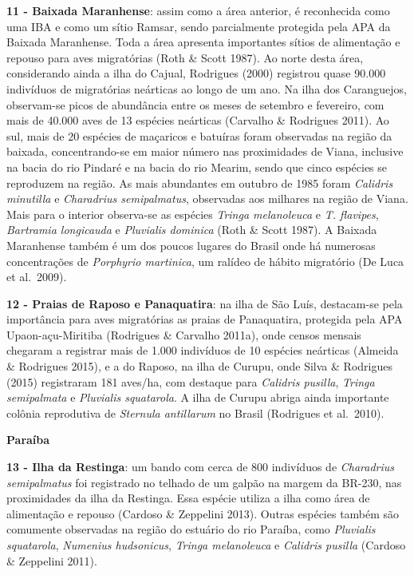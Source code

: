 \documentclass[
  oneside]{scrbook}
\begin{document}
\textbf{11 - Baixada Maranhense}: assim como a área anterior, é reconhecida como uma IBA e como um sítio Ramsar, sendo parcialmente protegida pela APA da Baixada Maranhense. Toda a área apresenta importantes sítios de alimentação e repouso para aves migratórias (Roth \& Scott 1987). Ao norte desta área, considerando ainda a ilha do Cajual, Rodrigues (2000) registrou quase 90.000 indivíduos de migratórias neárticas ao longo de um ano. Na ilha dos Caranguejos, observam-se picos de abundância entre os meses de setembro e fevereiro, com mais de 40.000 aves de 13 espécies neárticas (Carvalho \& Rodrigues 2011). Ao sul, mais de 20 espécies de maçaricos e batuíras foram observadas na região da baixada, concentrando-se em maior número nas proximidades de Viana, inclusive na bacia do rio Pindaré e na bacia do rio Mearim, sendo que cinco espécies se reproduzem na região. As mais abundantes em outubro de 1985 foram \emph{Calidris minutilla} e \emph{Charadrius semipalmatus}, observadas aos milhares na região de Viana. Mais para o interior observa-se as espécies \emph{Tringa melanoleuca} e \emph{T. flavipes}, \emph{Bartramia longicauda} e \emph{Pluvialis dominica} (Roth \& Scott 1987). A Baixada Maranhense também é um dos poucos lugares do Brasil onde há numerosas concentrações de \emph{Porphyrio martinica}, um ralídeo de hábito migratório (De Luca et al.~2009).

\textbf{12 - Praias de Raposo e Panaquatira}: na ilha de São Luís, destacam-se pela importância para aves migratórias as praias de Panaquatira, protegida pela APA Upaon-açu-Miritiba (Rodrigues \& Carvalho 2011a), onde censos mensais chegaram a registrar mais de 1.000 indivíduos de 10 espécies neárticas (Almeida \& Rodrigues 2015), e a do Raposo, na ilha de Curupu, onde Silva \& Rodrigues (2015) registraram 181 aves/ha, com destaque para \emph{Calidris pusilla}, \emph{Tringa semipalmata} e \emph{Pluvialis squatarola}. A ilha de Curupu abriga ainda importante colônia reprodutiva de \emph{Sternula antillarum} no Brasil (Rodrigues et al.~2010).

\textbf{Paraíba}

\textbf{13 - Ilha da Restinga}: um bando com cerca de 800 indivíduos de \emph{Charadrius semipalmatus} foi registrado no telhado de um galpão na margem da BR-230, nas proximidades da ilha da Restinga. Essa espécie utiliza a ilha como área de alimentação e repouso (Cardoso \& Zeppelini 2013). Outras espécies também são comumente observadas na região do estuário do rio Paraíba, como \emph{Pluvialis squatarola}, \emph{Numenius hudsonicus}, \emph{Tringa melanoleuca} e \emph{Calidris pusilla} (Cardoso \& Zeppelini 2011).
\end{document}
